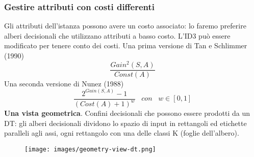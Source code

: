 \subsubsection{Gestire attributi con costi differenti}
Gli attributi dell'istanza possono avere un costo associato: lo faremo preferire alberi decisionali che utilizzano attributi a basso costo.
L'ID3 può essere modificato per tenere conto dei costi. Una prima versione di Tan e Schlimmer (1990)
$$\frac{Gain^2(S,A)}{Const(A)}$$
Una seconda versione di Nunez (1988)
$$\frac{2^{Gain(S,A)} - 1}{(Cost(A) + 1)^w} \hspace{10pt}con\hspace{10pt}w \in [0,1]$$
\textbf{Una vista geometrica}. Confini decisionali che possono essere prodotti da un DT: gli alberi decisionali dividono lo spazio di input 
in rettangoli ed etichette paralleli agli assi, ogni rettangolo con una delle classi K (foglie dell'albero).
\begin{figure}[h!]
    \centering
    \texttt{[image: images/geometry-view-dt.png]}
\end{figure}